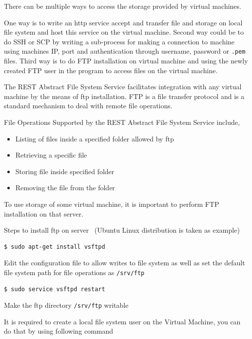 There can be multiple ways to access the storage provided by virtual
machines.

One way is to write an http service accept and transfer file and
storage on local file system and host this service on the virtual
machine. Second way could be to do SSH or SCP by writing a sub-process
for making a connection to machine using machines IP, port and
authentication through username, password or \verb|.pem| files. Third
way is to do FTP installation on virtual machine and using the newly
created FTP user in the program to access files on the virtual
machine.


The REST Abstract File System Service facilitates integration with any
virtual machine by the means of ftp installation. FTP is a file
transfer protocol and is a standard mechanism to deal with remote file
operations.


File Operations Supported by the REST Abstract File System Service include,
\begin{itemize}
    \item  Listing of files inside a specified folder allowed by ftp
    \item  Retrieving a specific file 
    \item  Storing file inside specified folder
    \item  Removing the file from the folder
\end{itemize}   

To use storage of some virtual machine, it is important to perform 
FTP installation on that server. 

Steps to install ftp on server~\cite{hid-sp18-420-FTP}
(Ubuntu Linux distribution is taken as example)


\begin{verbatim}
$ sudo apt-get install vsftpd
\end{verbatim}

Edit the configuration file to allow writes to file system as well as
set the default file system path for file operations as
\verb|/srv/ftp|

\begin{verbatim}
$ sudo service vsftpd restart
\end{verbatim}



Make the ftp directory \verb|/srv/ftp| writable 


It is required to create a local file system user on the Virtual
Machine, you can do that by using following command

